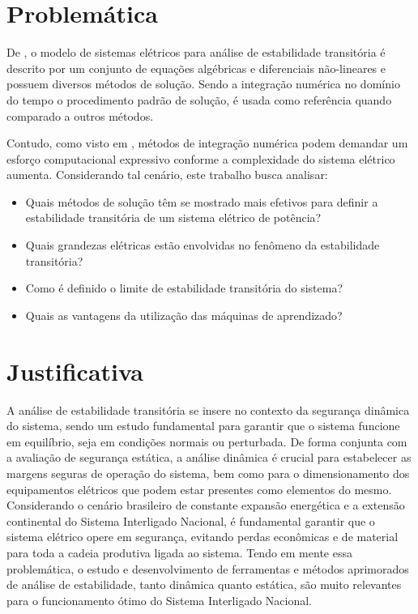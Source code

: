 \documentclass[12pt,oneside,a4paper,chapter=TITLE,section=TITLE,sumario=tradicional,english,brazil]{abntex2}
\begin{document}
	\section{Problemática}
	De \textcite{kundur1994}, o modelo de sistemas elétricos para análise de estabilidade transitória é descrito por um conjunto de equações algébricas e diferenciais não-lineares e possuem diversos métodos de solução. Sendo a integração numérica no domínio do tempo o procedimento padrão de solução, é usada como referência quando comparado a outros métodos.\par
Contudo, como visto em \textcite{swarup2002}, métodos de integração numérica podem demandar um esforço computacional expressivo conforme a complexidade do sistema elétrico aumenta.
Considerando tal cenário, este trabalho busca analisar:
	\begin{itemize}
	\item Quais métodos de solução têm se mostrado mais efetivos para definir a estabilidade transitória de um sistema elétrico de potência?
	\item Quais grandezas elétricas estão envolvidas no fenômeno da estabilidade transitória?
	\item Como é definido o limite de estabilidade transitória do sistema?
	\item Quais as vantagens da utilização das máquinas de aprendizado?
	\end{itemize}
	
	\section{Justificativa}
	A análise de estabilidade transitória se insere no contexto da segurança dinâmica do sistema, sendo um estudo fundamental para garantir que o sistema funcione em equilíbrio, seja em condições normais ou perturbada. 
De forma conjunta com a avaliação de segurança estática, a análise dinâmica é crucial para estabelecer as margens seguras de operação do sistema, bem como para o dimensionamento dos equipamentos elétricos que podem estar presentes como elementos do mesmo.
Considerando o cenário brasileiro de constante expansão energética e a extensão continental do Sistema Interligado Nacional, é fundamental garantir que o sistema elétrico opere em segurança, evitando perdas econômicas e de material para toda a cadeia produtiva ligada ao sistema.
Tendo em mente essa problemática, o estudo e desenvolvimento de ferramentas e métodos aprimorados de análise de estabilidade, tanto dinâmica quanto estática, são muito relevantes para o funcionamento ótimo do Sistema Interligado Nacional.
\end{document}
